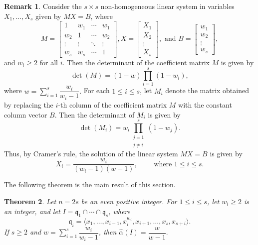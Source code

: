 \documentclass[12pt,reqno]{amsart}
\newtheorem{thm}{Theorem}[section]
\theoremstyle{definition}
\newtheorem{remark}[thm]{Remark}
\newcommand{\q}{\mathfrak{q}}
\newcommand{\ww}{\widehat{\alpha}}
\numberwithin{equation}{section}
\begin{document}
\begin{remark}\label{R-CramerRule} 
    Consider the $s \times s$ non-homogeneous linear system in variables $X_1, \ldots, X_s$ given by $M X = B$, where
    \[M = 
    \begin{bmatrix}
        1 & w_1 & \cdots & w_1 \\
        w_2 & 1 & \cdots & w_2 \\
        \vdots & \vdots & \ddots & \vdots \\
        w_s & w_s & \cdots & 1
    \end{bmatrix},
    X = 
    \begin{bmatrix}
        X_1 \\
        X_2 \\
        \vdots \\
        X_s
    \end{bmatrix},
    \text{ and } B = 
    \begin{bmatrix}
        w_1 \\
        w_2 \\
        \vdots \\
        w_s
    \end{bmatrix},\] and $w_i \ge 2$ for all $i.$
    Then the determinant of the coefficient matrix $M$ is given by
    \[\det(M) = (1 - w) \prod_{i = 1}^{s} (1 - w_i),\]
    where $w = \sum_{i = 1}^{s}\dfrac{w_i}{w_i - 1}.$ For each $1 \le i \le s$, let $M_i$ denote the matrix obtained by replacing the $i$-th column of the coefficient matrix $M$ with the constant column vector $B.$ Then the determinant of $M_i$ is given by
    \[\det(M_i) = w_i \prod_{\substack{j = 1 \\ j \ne i}}^{s} (1 - w_j).\]
    Thus, by Cramer's rule, the solution of the linear system $MX = B$ is given by
    \[X_i = \dfrac{w_i}{(w_i - 1)(w - 1)}, \qquad \text{ where } 1 \le i \le s.\] 
\end{remark}

The following theorem is the main result of this section.

\begin{thm}\label{Th-CounterExample}
    Let $n = 2s$ be an even positive integer. For $1 \le i \le s$, let $w_i \ge 2$ is an integer, and let $I = \q_1 \cap \cdots \cap \q_s$, where
    \[\q_i = \langle x_1, \ldots, x_{i - 1}, x_i^{w_i}, x_{i + 1}, \ldots, x_s, x_{s + i}\rangle.\]
    If $s \ge 2$ and $w = \sum_{i = 1}^{s} \dfrac{w_i}{w_i - 1}$, then $\ww(I) = \dfrac{w}{w - 1}.$
\end{thm}
\end{document}
